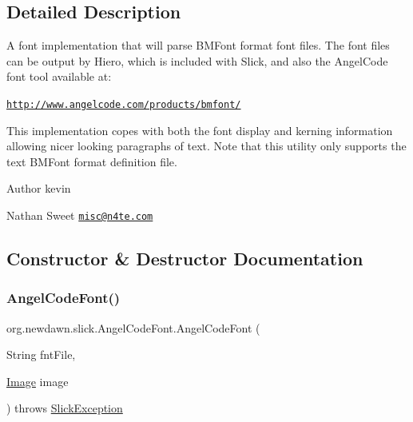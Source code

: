 \subsection{Detailed Description}
A font implementation that will parse B\+M\+Font format font files. The font files can be output by Hiero, which is included with Slick, and also the Angel\+Code font tool available at\+:

\href{http://www.angelcode.com/products/bmfont/}{\tt http\+://www.\+angelcode.\+com/products/bmfont/}

This implementation copes with both the font display and kerning information allowing nicer looking paragraphs of text. Note that this utility only supports the text B\+M\+Font format definition file.

\begin{DoxyAuthor}{Author}
kevin 

Nathan Sweet \href{mailto:misc@n4te.com}{\tt misc@n4te.\+com} 
\end{DoxyAuthor}


\subsection{Constructor \& Destructor Documentation}
\mbox{\label{classorg_1_1newdawn_1_1slick_1_1_angel_code_font_ace951b7ad8fa5c241e0abc04b753a19d}} 
\subsubsection{\texorpdfstring{Angel\+Code\+Font()}{AngelCodeFont()}\hspace{0.1cm}{\footnotesize\ttfamily [1/6]}}
{\footnotesize\ttfamily org.\+newdawn.\+slick.\+Angel\+Code\+Font.\+Angel\+Code\+Font (\begin{DoxyParamCaption}\item[{String}]{fnt\+File,  }\item[{\mbox{\hyperlink{classorg_1_1newdawn_1_1slick_1_1_image}{Image}}}]{image }\end{DoxyParamCaption}) throws \mbox{\hyperlink{classorg_1_1newdawn_1_1slick_1_1_slick_exception}{Slick\+Exception}}\hspace{0.3cm}{\ttfamily [inline]}}

